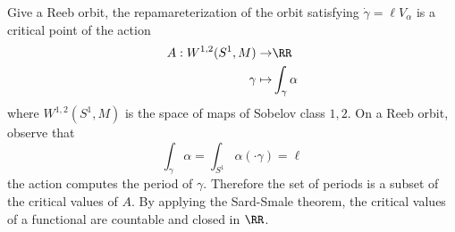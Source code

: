 
    Give a Reeb orbit, the repamareterization of the orbit satisfying $\dot \gamma = \ell V_\alpha$ is a critical point of the action 
    \begin{align*}
        A:W^{1,2}(S^1, M)\to& \RR\\
        \gamma\mapsto& \int_{\gamma}\alpha
    \end{align*}
    where $W^{1,2}(S^1, M)$ is the space of maps of Sobelov class $1,2$.
    On a Reeb orbit, observe that 
    \[\int_{\gamma}\alpha= \int_{S^1} \alpha(\cdot \gamma) = \ell\]
    the action computes the period of $\gamma$. Therefore the set of periods is a subset of the critical values of $A$. By applying the Sard-Smale theorem, the critical values of a functional are countable and closed in $\RR$.
